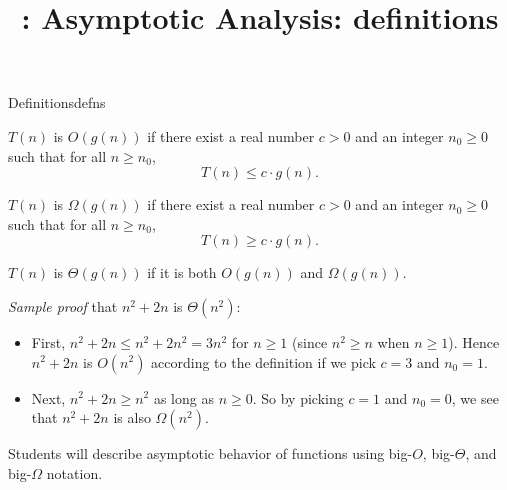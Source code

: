 \documentclass{tufte-handout}
\title{\thecourse: Asymptotic Analysis: definitions}
\date{}
\begin{document}
\maketitle

\begin{model*}{Definitions}{defns}
  \begin{defn}[Big-O] 
    $T(n)$ is $O(g(n))$ if there exist a real number $c > 0$ and an
    integer $n_0 \geq 0$ such that for all $n \geq n_0$,
    \[ T(n) \leq c \cdot g(n). \]
  \end{defn}

  \begin{defn} 
    $T(n)$ is $\Omega(g(n))$ if there exist a real number $c > 0$ and an
    integer $n_0 \geq 0$ such that
    for all $n \geq n_0$, \[ T(n) \geq c \cdot g(n). \]
  \end{defn}

  \begin{defn} 
    $T(n)$ is $\Theta(g(n))$ if it is both $O(g(n))$ and $\Omega(g(n))$.
  \end{defn}

  \emph{Sample proof} that $n^2 + 2n$ is $\Theta(n^2)$:
  \begin{itemize}
  \item First, $n^2 + 2n \leq n^2 + 2n^2 = 3n^2$ for $n \geq 1$ (since
    $n^2 \geq n$ when $n \geq 1$).  Hence $n^2 + 2n$ is $O(n^2)$
    according to the definition if we pick $c = 3$ and $n_0 = 1$.
  \item Next, $n^2 + 2n \geq n^2$ as long as $n \geq 0$.  So by
    picking $c = 1$ and $n_0 = 0$, we see that $n^2 + 2n$ is also
    $\Omega(n^2)$.
  \end{itemize}
\end{model*}

\begin{objective}
  Students will describe asymptotic behavior of functions
  using big-$O$, big-$\Theta$, and big-$\Omega$ notation.
\end{objective}
\end{document}
